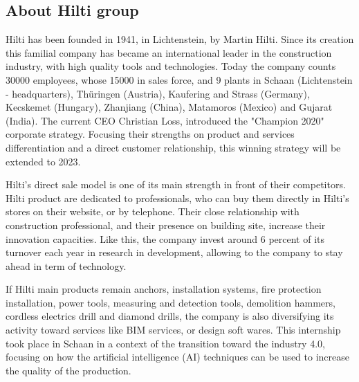 \documentclass[12pt, french, a4paper]{article} %
\begin{document}
\subsection{About Hilti group}
\hspace{24pt} Hilti has been founded in 1941, in Lichtenstein, by Martin Hilti. Since its creation this familial company has became an international leader in the construction industry, with high quality tools and technologies. Today the company counts 30000 employees, whose 15000 in sales force, and 9 plants in Schaan (Lichtenstein - headquarters), Thüringen (Austria), Kaufering and Strass (Germany), Kecskemet (Hungary), Zhanjiang (China), Matamoros (Mexico) and Gujarat (India). The current CEO Christian Loss, introduced the "Champion 2020" corporate strategy. Focusing their strengths on product and services differentiation and a direct customer relationship, this winning strategy will be extended to 2023.
\par Hilti's direct sale model is one of its main strength in front of their competitors. Hilti product are dedicated to professionals, who can buy them directly in Hilti's stores on their website, or by telephone. Their close relationship with construction professional, and their presence on building site, increase their innovation capacities. Like this, the company invest around 6 percent of its turnover each year in research in development, allowing to the company to stay ahead in term of technology. 
\par If Hilti main products remain anchors, installation systems, fire protection installation, power tools, measuring and detection tools, demolition hammers, cordless electrics drill and diamond drills, the company is also diversifying its activity toward services like \gls{BIM} services, or design soft wares. This internship took place in Schaan in a context of the transition toward the industry 4.0, focusing on how the artificial intelligence (\gls{AI}) techniques can be used to increase the quality of the production. 
\end{document}
